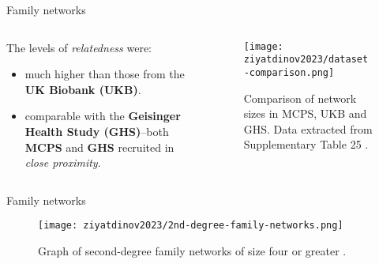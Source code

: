 \begin{frame}{Family networks}
    \begin{columns}
        \begin{column}{0.5\textwidth}

            The levels of \textit{relatedness} were:
            \begin{itemize}
                \item much higher than those from the \textbf{UK Biobank (UKB)}.
                \item comparable with the \textbf{Geisinger Health Study (GHS)}--both \textbf{MCPS} and \textbf{GHS} recruited in \textit{close proximity}.
            \end{itemize}
        \end{column}

        \begin{column}{0.5\textwidth}
            \begin{figure}[htpb]
                \centering
                \texttt{[image: ziyatdinov2023/dataset-comparison.png]}
                \caption{Comparison of network sizes in MCPS, UKB and GHS. Data extracted from Supplementary Table 25 \parencite{ziyatdinov2023}.}
                \label{fig:label}
            \end{figure}
        \end{column}
    \end{columns}
\end{frame}

\begin{frame}[t]{Family networks}

    \begin{figure}[htpb]
        \centering
        \texttt{[image: ziyatdinov2023/2nd-degree-family-networks.png]}
        \caption{Graph of second-degree family networks of size four or greater \parencite{ziyatdinov2023}.}
        \label{fig:2nd-degree-megaplot}
    \end{figure}

\end{frame}
